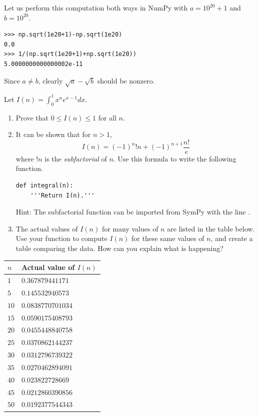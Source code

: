 Let us perform this computation both ways in NumPy with $a=10^{20}+1$ and $b=10^{20}$.
\begin{lstlisting}
>>> np.sqrt(1e20+1)-np.sqrt(1e20)
0.0
>>> 1/(np.sqrt(1e20+1)+np.sqrt(1e20))
5.0000000000000002e-11
\end{lstlisting}
Since $a \neq b$, clearly $\sqrt{a}-\sqrt{b}$ should be nonzero.


\begin{problem}
Let $I(n) = \int_0^1 x^n e^{x - 1} dx$.
\begin{enumerate}
\item Prove that $0 \leq I(n) \leq 1$ for all $n$.
\item It can be shown that for $n>1$,
\[
I(n) = \left(-1\right)^{n} !n + \left(-1\right)^{n + 1} \frac{n!}{e}
\]
where $!n$ is the \emph{subfactorial} of $n$.
Use this formula to write the following function.
\begin{lstlisting}
def integral(n):
    '''Return I(n).'''
\end{lstlisting}
Hint: The subfactorial function can be imported from SymPy with the line .
\item The actual values of $I(n)$ for many values of $n$ are listed in the table below.
Use your function  to compute $I(n)$ for these same values of $n$, and create a table comparing the data.
How can you explain what is happening?
\end{enumerate}

\begin{center}
\begin{tabular}{|l|l|}
\hline
$n$  & Actual value of $I(n)$ \\
\hline
$1$  & $0.367879441171$ \\
$5$  & $0.145532940573$ \\
$10$ & $0.0838770701034$ \\
$15$ & $0.0590175408793$ \\
$20$ & $0.0455448840758$ \\
$25$ & $0.0370862144237$ \\
$30$ & $0.0312796739322$ \\
$35$ & $0.0270462894091$ \\
$40$& $0.023822728669$ \\
$45$& $0.0212860390856$ \\
$50$ & $0.0192377544343$ \\
\hline
\end{tabular}
\end{center}

\end{problem}



